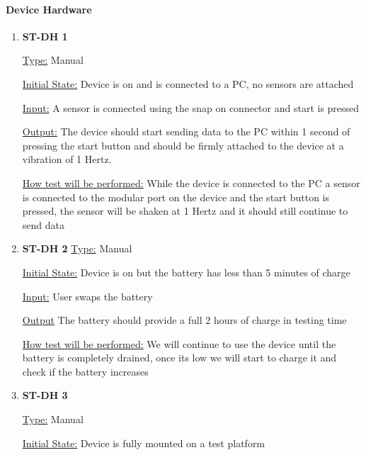\documentclass[12pt, titlepage]{article}
\begin{document}
  \paragraph{Device Hardware}	
  \begin{enumerate}
  
    \item{\bf{ST-DH 1}}
    
    \underline{Type:} Manual
              
    \underline{Initial State:} Device is on and is connected to a PC, no sensors are attached
              
    \underline{Input:} A sensor is connected using the snap on connector and start is pressed
              
    \underline{Output:} The device should start sending data to the PC within 1 second of pressing the start button and should be firmly attached to the device at a vibration of 1 Hertz.
              
    \underline{How test will be performed:} While the device is connected to the PC a sensor is connected to the modular port on the device and the start button is pressed, the sensor will be shaken at 1 Hertz and it should still continue to send data\\
    \newpage
    \item{\bf{ST-DH 2}}
    \underline{Type:} Manual
              
    \underline{Initial State:} Device is on but the battery has less than 5 minutes of charge
              
    \underline{Input:} User swaps the battery
              
    \underline{Output} The battery should provide a full 2 hours of charge in testing time
    
              
    \underline{How test will be performed:} We will continue to use the device until the battery is completely drained, once its low we will start to charge it and check if the battery increases\\

    \item{\bf{ST-DH 3}}
    
    \underline{Type:} Manual
              
    \underline{Initial State:} Device is fully mounted on a test platform
              

\end{enumerate}
\end{document}
